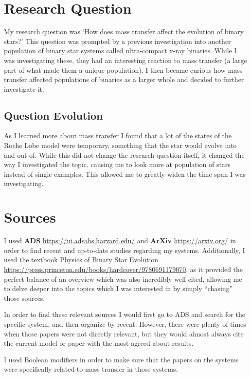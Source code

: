 \documentclass[12pt, a4paper]{article}
\begin{document}
\section{Research Question}
    My research question was `How does mass transfer affect the evolution of binary stars?' This question was prompted by a previous investigation into another population of binary star systems called ultra-compact x-ray binaries. While I was investigating these, they had an interesting reaction to mass transfer (a large part of what made them a unique population). I then became curious how mass transfer affected populations of binaries as a larger whole and decided to further investigate it.

    \subsection{Question Evolution}    
        As I learned more about mass transfer I found that a lot of the states of the Roche Lobe model were temporary, something that the star would evolve into and out of. While this did not change the research question itself, it changed the way I investigated the topic, causing me to look more at population of stars instead of single examples. This allowed me to greatly widen the time span I was investigating.
\section{Sources}
    I used \textbf{ADS} \url{https://ui.adsabs.harvard.edu/} and \textbf{ArXiv} \url{https://arxiv.org}/ in order to find recent and up-to-date studies regarding my systems. Additionally, I used the textbook Physics of Binary Star Evolution \url{https://press.princeton.edu/books/hardcover/9780691179070}, as it provided the perfect balance of an overview which was also incredibly well cited, allowing me to delve deeper into the topics which I was interested in by simply ``chasing'' those sources. 

    In order to find these relevant sources I would first go to ADS and search for the specific system, and then organize by recent. However, there were plenty of times when those papers were not directly relevant, but they would almost always cite the current model or paper with the most agreed about results. 

    I used Boolean modifiers in order to make sure that the papers on the systems were specifically related to mass transfer in those systems.
\end{document}
